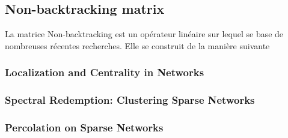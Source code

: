 \subsection{Non-backtracking matrix}
La matrice Non-backtracking est un opérateur linéaire sur lequel se base de nombreuses récentes recherches.
Elle se construit de la manière suivante   
\subsubsection{Localization and Centrality in Networks }
\subsubsection{Spectral Redemption: Clustering Sparse Networks}
\subsubsection{Percolation on Sparse Networks}
